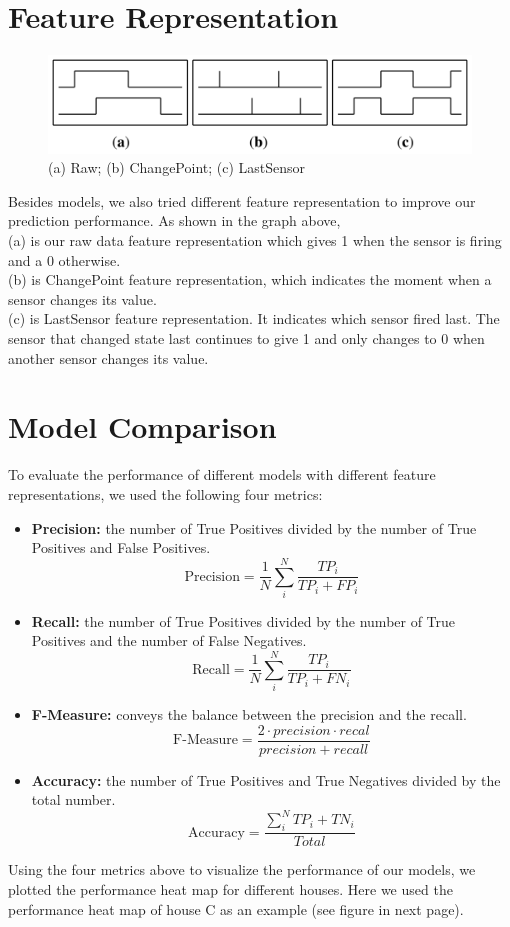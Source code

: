 \documentclass[10pt,letter]{article}
\numberwithin{equation}{section} %
\numberwithin{figure}{section} %
\numberwithin{table}{section} %
\begin{document}
\section{Feature Representation}
\begin{figure}[h]
\centering
\includegraphics[width=14cm]{../plot/feature}
\caption{ (a) Raw; (b) ChangePoint; (c) LastSensor}
\end{figure}
Besides models, we also tried different feature representation to improve our prediction performance. 
As shown in the graph above, 
\\(a) is our raw data feature representation which gives 1 when the sensor is firing and a 0 otherwise.  
\\(b) is ChangePoint feature representation, which indicates the moment when a sensor changes its value. 
\\(c) is LastSensor feature representation. It indicates which sensor fired last. The sensor that changed state last continues to give 1 and only changes to 0 when another sensor changes its value.

\section{Model Comparison}
To evaluate the performance of different models with different feature representations, we used the following four metrics:
\begin{itemize}
\item \textbf{Precision:} the number of True Positives divided by the number of True Positives and False Positives.
$$\text{Precision} = \frac{1}{N}\sum^N_i \frac{TP_i}{TP_i+FP_i} $$
\item \textbf{Recall:} the number of True Positives divided by the number of True Positives and the number of False Negatives.
$$\text{Recall} = \frac{1}{N}\sum^N_i\frac{TP_i}{TP_i + FN_i} $$
\item \textbf{F-Measure:} conveys the balance between the precision and the recall.
$$\text{F-Measure} = \frac{2 \cdot precision \cdot recal}{precision+recall} $$
\item \textbf{Accuracy:} the number of True Positives and True Negatives divided by the total number.
$$\text{Accuracy} = \frac{\sum^N_i TP_i + TN_i}{Total}$$
\end{itemize}
Using the four metrics above to visualize the performance of our models, we plotted the performance heat map for different houses. Here we used the performance heat map of house C as an example (see figure in next page).
\end{document}
